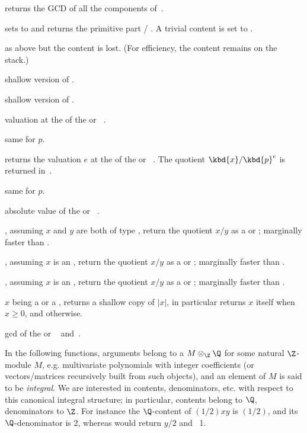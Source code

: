  returns the GCD of all the components of~.

 sets  to 
and returns the primitive part  / . A trivial content is set to
.

 as above but the content is lost.
(For efficiency, the content remains on the stack.)

 shallow version of .

 shallow version of .


 valuation at the  
of the  or ~.

 same for  $p$.

 returns the valuation $e$ at the
  of the  or ~. The quotient
$\kbd{x}/\kbd{p}^{e}$ is returned in~.

 same for  $p$.

 absolute value of the  or
~.

, assuming $x$ and $y$
are both of type , return the quotient $x/y$ as a  or
; marginally faster than .

, assuming $x$
is an , return the quotient $x/y$ as a  or
; marginally faster than .

, assuming $x$
is an , return the quotient $x/y$ as a  or
; marginally faster than .

 $x$ being a  or a , returns
a shallow copy of $|x|$, in particular returns $x$ itself when $x \geq 0$, and
 otherwise.

 gcd of the  or ~
and~.
\smallskip

In the following functions, arguments belong to a $M\otimes_\Z\Q$
for some natural $\Z$-module $M$, e.g. multivariate polynomials with integer
coefficients (or vectors/matrices recursively built from such objects), and
an element of $M$ is said to be \emph{integral}.
We are interested in contents, denominators, etc. with respect to this
canonical integral structure; in particular, contents belong to $\Q$,
denominators to $\Z$. For instance the $\Q$-content of $(1/2)xy$ is $(1/2)$,
and its $\Q$-denominator is $2$, whereas  would return $y/2$ and
~1.

